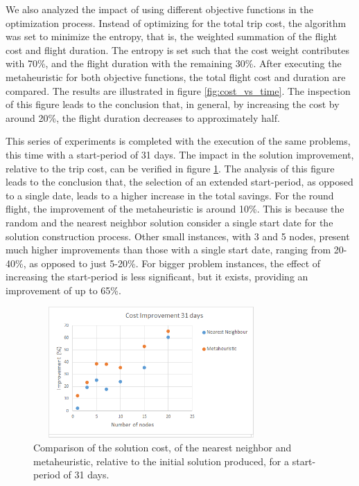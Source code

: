 We also analyzed the impact of using different objective functions in the optimization process. Instead of optimizing for the total trip cost, the algorithm was set to minimize the entropy, that is, the weighted summation of the flight cost and flight duration. The entropy is set such that the cost weight contributes with 70\%, and the flight duration with the remaining 30\%. After executing the metaheuristic for both objective functions, the total flight cost and duration are compared. The results are illustrated in figure \ref{fig:cost_vs_time}. The inspection of this figure leads to the conclusion that, in general, by increasing the cost by around 20\%, the flight duration decreases to approximately half.


This series of experiments is completed with the execution of the same problems, this time with a start-period of 31 days. The impact in the solution improvement, relative to the trip cost, can be verified in figure \ref{fig:prices_31}. The analysis of this figure leads to the conclusion that, the selection of an extended start-period, as opposed to a single date, leads to a higher increase in the total savings. For the round flight, the improvement of the metaheuristic is around 10\%. This is because the random and the nearest neighbor solution consider a single start date for the solution construction process. Other small instances, with 3 and 5 nodes, present much higher improvements than those with a single start date, ranging from 20-40\%, as opposed to just 5-20\%. For bigger problem instances, the effect of increasing the start-period is less significant, but it exists, providing an improvement of up to 65\%.

\begin{figure}[tbp]
  \centering
  \includegraphics[width=9cm, height=5cm]{./imgs/improvement_31.png}
  \caption{Comparison of the solution cost, of the nearest neighbor and metaheuristic, relative to the initial solution produced, for a start-period of 31 days.}
  \label{fig:prices_31}  
\end{figure}





